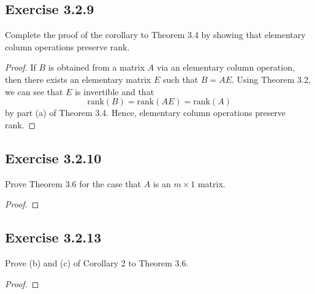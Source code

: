 \subsection*{Exercise 3.2.9} Complete the proof of the corollary to Theorem 3.4 by showing that elementary column operations preserve rank.
\begin{proof}
If \( B  \) is obtained from a matrix \( A  \) via an elementary column operation, then there exists an elementary matrix \( E  \) such that \( B = AE  \). Using Theorem 3.2, we can see that \( E  \) is invertible and that 
\[  \text{rank}(B) = \text{rank}(AE) = \text{rank}(A) \] by part (a) of Theorem 3.4.
Hence, elementary column operations preserve rank.
\end{proof}

\subsection*{Exercise 3.2.10} Prove Theorem 3.6 for the case that \( A  \) is an \( m \times 1  \) matrix.
\begin{proof}

\end{proof}

\subsection*{Exercise 3.2.13} Prove (b) and (c) of Corollary 2 to Theorem 3.6.
\begin{proof}

\end{proof}

